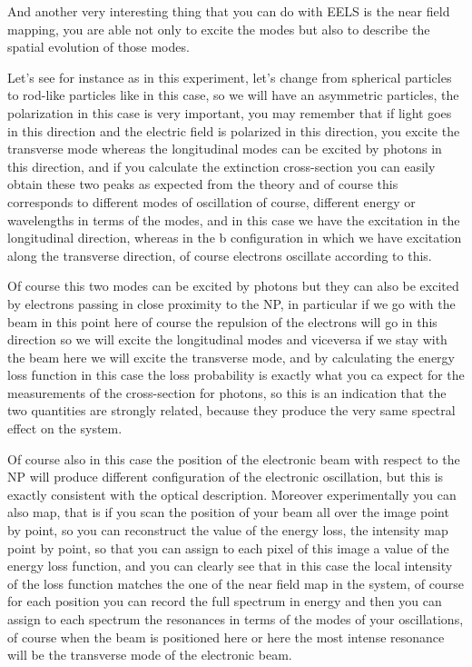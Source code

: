 \documentclass[../main/main.tex]{subfiles}
\begin{document}
And another very interesting thing that you can do with EELS is the near field mapping, you are able not only to excite the modes but also to describe the spatial evolution of those modes.

Let's see for instance as in this experiment, let's change from spherical particles to rod-like particles like in this case, so we will have an asymmetric particles, the polarization in this case is very important, you may remember that if light goes in this direction and the electric field is polarized in this direction, you excite the transverse mode whereas the longitudinal modes can be excited by photons in this direction, and if you calculate the extinction cross-section you can easily obtain these two peaks as expected from the theory and of course this corresponds to different modes of oscillation of course, different energy or wavelengths in terms of the modes, and in this case we have the excitation in the longitudinal direction, whereas in the b configuration in which we have excitation along the transverse direction, of course electrons oscillate according to this.

Of course this two modes can be excited by photons but they can also be excited by electrons passing in close proximity to the NP, in particular if we go with the beam in this point here of course the repulsion of the electrons will go in this direction so we will excite the longitudinal modes and viceversa if we stay with the beam here we will excite the transverse mode, and by calculating the energy loss function in this case the loss probability is exactly what you ca expect for the measurements of the cross-section for photons, so this is an indication that the two quantities are strongly related, because they produce the very same spectral effect on the system.

Of course also in this case the position of the electronic beam with respect to the NP will produce different configuration of the electronic oscillation, but this is exactly consistent with the optical description. Moreover experimentally you can also map, that is if you scan the position of your beam all over the image point by point, so you can reconstruct the value of the energy loss, the intensity map point by point, so that you can assign to each pixel of this image a value of the energy loss function, and you can clearly see that in this case the local intensity of the loss function matches the one of the near field map in the system, of course for each position you can record the full spectrum in energy and then you can assign to each spectrum the resonances in terms of the modes of your oscillations, of course when the beam is positioned here or here the most intense resonance will be the transverse mode of the electronic beam.
\end{document}
